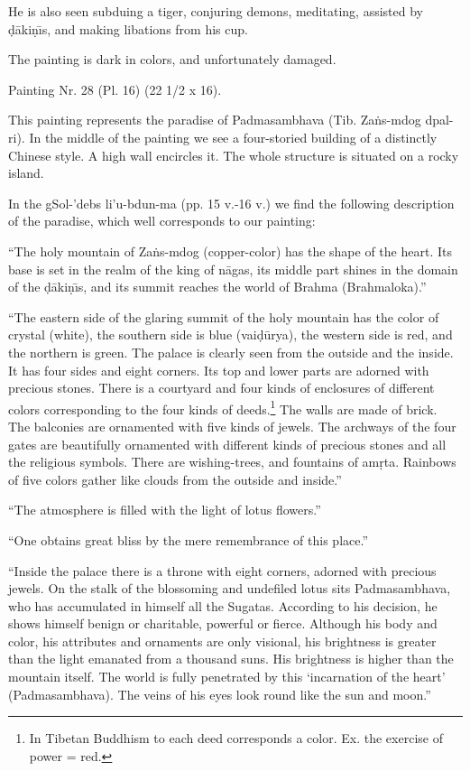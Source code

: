 \documentclass[a4paper, 12pt, oneside]{article}
\begin{document}
He is also seen subduing a tiger, conjuring demons, meditating, assisted by \d{d}\={a}ki\d{n}\={\i}s, and making libations from his cup.

The painting is dark in colors, and unfortunately damaged.

\bigskip

Painting Nr. 28 (Pl. 16) (22 1/2 x 16).

\bigskip

This painting represents the paradise of Padmasambhava (Tib. Za\.{n}s-mdog dpal-ri). In the middle of the painting we see a four-storied building of a distinctly Chinese style. A high wall encircles it. The whole structure is situated on a rocky island.

In the gSol-'debs li'u-bdun-ma (pp. 15 v.-16 v.) we find the following description of the paradise, which well corresponds to our painting:

``The holy mountain of Za\.{n}s-mdog (copper-color) has the shape of the heart. Its base is set in the realm of the king of n\={a}gas, its middle part shines in the domain of the \d{d}\={a}ki\d{n}\={\i}s, and its summit reaches the world of Brahma (Brahmaloka).''

``The eastern side of the glaring summit of the holy mountain has the color of crystal (white), the southern side is blue (vai\d{d}\={u}rya), the western side is red, and the northern is green. The palace is clearly seen from the outside and the inside. It has four sides and eight corners. Its top and lower parts are adorned with precious stones. There is a courtyard and four kinds of enclosures of different colors corresponding to the four kinds of deeds.\footnote{In Tibetan Buddhism to each deed corresponds a color. Ex. the exercise of power = red.} The walls are made of brick. The balconies are ornamented with five kinds of jewels. The  archways of the four gates are beautifully ornamented with different kinds of precious stones and all the religious symbols. There are wishing-trees, and fountains of am\d{r}ta. Rainbows of five colors gather like clouds from the outside and inside.''

``The atmosphere is filled with the light of lotus flowers.''

``One obtains great bliss by the mere remembrance of this place.''

``Inside the palace there is a throne with eight corners, adorned with  precious jewels. On the stalk of the blossoming and undefiled lotus sits Padmasambhava, who has accumulated in himself all the Sugatas. According to his decision, he shows himself benign or charitable, powerful or fierce. Although his body and color, his attributes and ornaments are only visional, his brightness is greater than the light emanated from a thousand suns. His brightness is higher than the mountain itself. The world is fully penetrated by this `incarnation of the heart' (Padmasambhava). The veins of his eyes look round like the sun and moon.''
\end{document}
